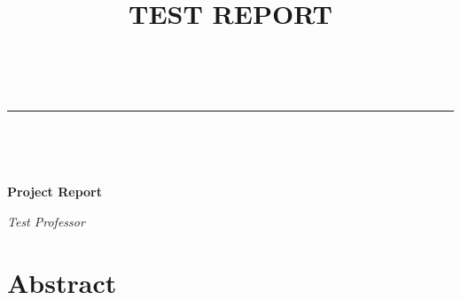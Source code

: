 \documentclass[a4paper,11pt]{article}
\makeatletter
\newcommand{\linia}{\rule{\linewidth}{0.5pt}}
\theoremstyle{mytheor}
\renewcommand{\maketitle}{
\begin{center}
{\huge \textsc{\@title}}
\\
\linia\\
\end{center}
}
\makeatother
\begin{document}
\title{TEST REPORT}
\author{}
\date{}
\maketitle
\normalsize {} \hfill {}
\\
\normalsize {}
\begin{center}

\Large
\vspace*{\fill}
\begin{LARGE}
\textbf{Project Report}
\vspace{20mm}


\end{LARGE}
\vspace*{\fill}

\textit{Test Professor}


\vspace{0.8cm}
\end{center}
\clearpage
\tableofcontents
\clearpage
\section{Abstract}
\blindtext
\clearpage
\end{document}
